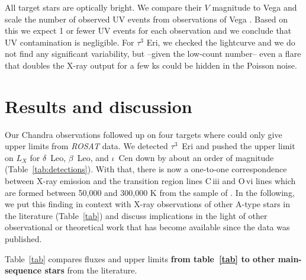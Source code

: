 \documentclass[linenumbers]{aastex631}
\begin{document}
All target stars are optically bright. We compare their $V$ magnitude
to Vega and scale the number of observed UV events from observations
of Vega \citep{2006ApJ...636..426P}. Based on this we expect 1 or fewer UV
events for each observation and we conclude that UV contamination is
negligible. For $\tau^3$ Eri, we checked the lightcurve and we do not find any significant variability, but --given the low-count number-- even a flare that doubles the X-ray output for a few ks could be hidden in the Poisson noise.


\section{Results and discussion}  \label{sec:discussion}
Our Chandra observations followed up on four targets where \cite{2002ApJ...579..800S} could only give upper limits from \emph{ROSAT} data. We detected $\tau^3$~Eri and pushed the upper limit on $L_X$ for $\delta$~Leo, $\beta$~Leo, and $\iota$~Cen down by about an order of magnitude (Table~\ref{tab:detections}). With that, there is now a one-to-one correspondence between X-ray emission and the transition region lines C\,{\sc iii} and O\,{\sc vi} lines which are formed between 50,000 and 300,000 K from the sample of \cite{2002ApJ...579..800S}. In the following, we put this finding in context with X-ray observations of other A-type stars in the literature (Table~\ref{tab}) and discuss implications in the light of other observational or theoretical work that has become available since the \cite{2002ApJ...579..800S} data was published.

Table~\ref{tab} compares fluxes and upper limits \textbf{from table~\ref{tab} to other main-sequence stars} from the literature.
\end{document}
